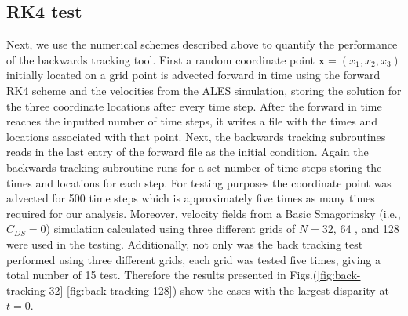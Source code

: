 \subsection{RK4 test}\label{sec:rk4-test} 
Next, we use the numerical schemes described above to
quantify the performance of the backwards tracking tool. First a random
coordinate point $\mathbf{x}=(x_{1}, x_{2}, x_{3})$ initially located on a
grid point is advected forward in time using the forward RK4 scheme and the
velocities from the ALES simulation, storing the solution for the three
coordinate locations after every time step. After the forward in time
reaches the inputted number of time steps, it writes a file with the times
and locations associated with that point. Next, the backwards tracking
subroutines reads in the last entry of the forward file as the initial
condition. Again the backwards tracking subroutine runs for a set number of
time steps storing the times and locations for each step. For testing
purposes the coordinate point was advected for 500 time steps which is
approximately five times as many times required for our analysis. Moreover,
velocity fields from a Basic Smagorinsky (i.e., $C_{DS} =0$) simulation
calculated using three different grids of $N=$32, 64 , and 128 were used in
the testing.  Additionally, not only was the back tracking test performed
using three different grids, each grid was tested five times, giving a
total number of 15 test. Therefore the results presented in
Figs.(\ref{fig:back-tracking-32}-\ref{fig:back-tracking-128}) show the
cases with the largest disparity at $t=0$.  

